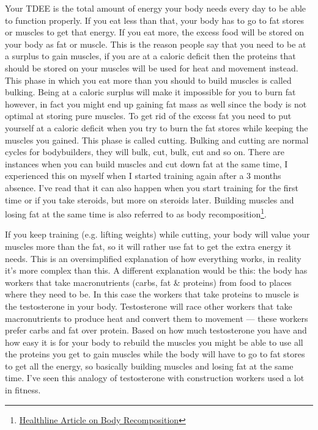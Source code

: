 \documentclass[openany, 12pt]{book}
\begin{document}
	Your TDEE is the total amount of energy your body needs every day to be able to function properly. If you eat less than that, your body has to go to fat stores or muscles to get that energy. If you eat more, the excess food will be stored on your body as fat or muscle. This is the reason people say that you need to be at a surplus to gain muscles, if you are at a caloric deficit then the proteins that should be stored on your muscles will be used for heat and movement instead. This phase in which you eat more than you should to build muscles is called bulking. Being at a caloric surplus will make it impossible for you to burn fat however, in fact you might end up gaining fat mass as well since the body is not optimal at storing pure muscles. To get rid of the excess fat you need to put yourself at a caloric deficit when you try to burn the fat stores while keeping the muscles you gained. This phase is called cutting. Bulking and cutting are normal cycles for bodybuilders, they will bulk, cut, bulk, cut and so on. There are instances when you can build muscles and cut down fat at the same time, I experienced this on myself when I started training again after a 3 months absence. I've read that it can also happen when you start training for the first time or if you take steroids, but more on steroids later. Building muscles and losing fat at the same time is also referred to as body recomposition\footnote{\href{https://www.healthline.com/nutrition/body-recomposition\#how-it-works}{Healthline Article on Body Recomposition}}.
	
	If you keep training (e.g. lifting weights) while cutting, your body will value your muscles more than the fat, so it will rather use fat to get the extra energy it needs. This is an oversimplified explanation of how everything works, in reality it's more complex than this. A different explanation would be this: the body has workers that take macronutrients (carbs, fat \& proteins) from food to places where they need to be. In this case the workers that take proteins to muscle is the testosterone in your body. Testosterone will race other workers that take macronutrients to produce heat and convert them to movement --- these workers prefer carbs and fat over protein. Based on how much testosterone you have and how easy it is for your body to rebuild the muscles you might be able to use all the proteins you get to gain muscles while the body will have to go to fat stores to get all the energy, so basically building muscles and losing fat at the same time. I've seen this analogy of testosterone with construction workers used a lot in fitness. 
	
\end{document}
